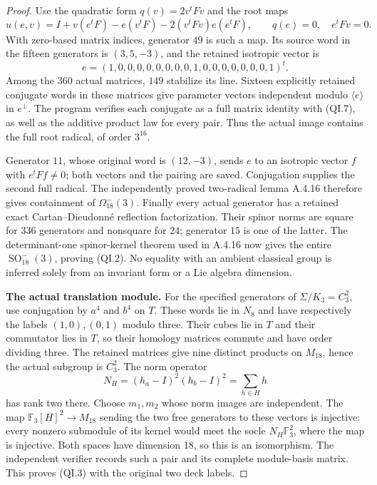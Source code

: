 \begin{proof}
Use the quadratic form $q(v)=2v^tFv$ and the root maps
\[
 u(e,v)=I+v(e^tF)-e(v^tF)
              -2(v^tFv)e(e^tF),\qquad
 q(e)=0,\quad e^tFv=0.                                 \tag{QI.7}
\]
With zero-based matrix indices, generator $49$ is
such a map.  Its source word in the fifteen generators
is $(3,5,-3)$, and the retained isotropic vector is
\[
 e=(1,0,0,0,0,0,0,0,0,1,0,0,0,0,0,0,0,1)^t.
                                                        \tag{QI.8}
\]
Among the $360$ actual matrices, $149$ stabilize its
line.  Sixteen explicitly retained conjugate words
in these matrices give parameter vectors independent
modulo $\langle e\rangle$ in $e^\perp$.
The program verifies each conjugate as a full matrix
identity with (QI.7), as well as the additive product
law for every pair.  Thus the actual image contains
the full root radical, of order $3^{16}$.

Generator $11$, whose original word is $(12,-3)$,
sends $e$ to an isotropic vector $f$ with
$e^tFf\ne0$; both vectors and the pairing are saved.
Conjugation supplies the second full radical.
The independently proved two-radical lemma A.4.16
therefore gives containment of $\Omega_{18}^-(3)$.
Finally every actual generator has a retained exact
Cartan--Dieudonn\'e reflection factorization.  Their
spinor norms are square for $336$ generators and
nonsquare for $24$; generator $15$ is one of the
latter.  The determinant-one spinor-kernel theorem
used in A.4.16 now gives the entire
$\operatorname{SO}_{18}^-(3)$, proving (QI.2).
No equality with an ambient classical group is
inferred solely from an invariant form or a Lie
algebra dimension.

\textbf{The actual translation module.}
For the specified generators of $\Sigma/K_3=C_3^2$,
use conjugation by $a^4$ and $b^4$ on $T$.
These words lie in $N_8$ and have respectively the
labels $(1,0),(0,1)$ modulo three.  Their cubes lie
in $T$ and their commutator lies in $T$, so their
homology matrices commute and have order dividing
three.  The retained matrices give nine distinct
products on $M_{18}$, hence the actual subgroup is
$C_3^2$.  The norm operator
\[
 N_H=(h_a-I)^2(h_b-I)^2=\sum_{h\in H}h
                                                        \tag{QI.9}
\]
has rank two there.  Choose $m_1,m_2$ whose norm
images are independent.  The map
$\mathbb F_3[H]^2\to M_{18}$ sending the two free
generators to these vectors is injective: every
nonzero submodule of its kernel would meet the
socle $N_H\mathbb F_3^2$, where the map is injective.
Both spaces have dimension $18$, so this is an
isomorphism.  The independent verifier records
such a pair and its complete module-basis matrix.
This proves (QI.3) with the original two deck labels.


\end{proof}
